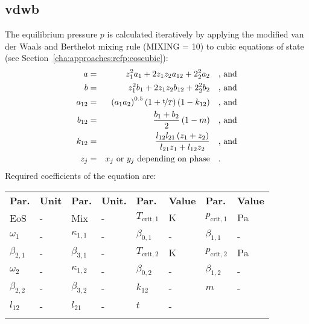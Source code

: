 \subsection{vdwb}
\label{cha:approaches:abs:mic:vdwb}
%
The equilibrium pressure $p$ is calculated iteratively by applying the modified van der Waals and Berthelot mixing rule (MIXING = 10) to cubic equations of state (see Section~\ref{cha:approaches:refp:eoscubic}):
%
\begin{equation*}
	\begin{split}
		a &=& z_1^2 a_1 + 2 z_1 z_2 a_{12} + 2_2^2 a_2 & \quad\text{, and} \\
		b &=& z_1^2 b_1 + 2 z_1 z_2 b_{12} + 2_2^2 b_2 & \quad\text{, and} \\
		a_{12} &=& \left( a_1 a_2 \right) ^{0.5} \left( 1 + \nicefrac{t}{T} \right) \left(1 - k_{12} \right) & \quad\text{, and} \\
		b_{12} &=& \frac{ b_1 + b_2 }{2} \left(1 - m \right) & \quad\text{, and} \\
		k_{12} &=& \frac{l_{12} l_{21} \left(z_1 + z_2 \right)}{l_{21} z_1 + l_{12} z_2} & \quad\text{, and} \\
		z_j &=& x_j \textrm { or } y_j \textrm{ depending on phase} & \quad\text{.} \\
	\end{split}
\end{equation*}
%
Required coefficients of the equation are:
%
\begin{longtable}[l]{ll|ll|ll|ll}
	\toprule
	\addlinespace
	\textbf{Par.} & \textbf{Unit} & \textbf{Par.} &	\textbf{Unit.} & \textbf{Par.} & \textbf{Value} & \textbf{Par.} & \textbf{Value} \\
	\addlinespace
	\midrule
	\endhead
	
	\bottomrule
	\endfoot
	\bottomrule
	\endlastfoot
	\addlinespace
	
	EoS & - & Mix & - &$T_\mathrm{crit,1}$ & $\si{\kelvin}$ &$p_\mathrm{crit,1}$ & $\si{\pascal}$ \\
	$\omega_{1}$ & - &$\kappa_{1,1}$ & - &$\beta_{0,1}$ & - &$\beta_{1,1}$ & - \\
	$\beta_{2,1}$ & - &$\beta_{3,1}$ & - &$T_\mathrm{crit,2}$ & $\si{\kelvin}$ &$p_\mathrm{crit,2}$ & $\si{\pascal}$ \\
	$\omega_{2}$ & - &$\kappa_{1,2}$ & - &$\beta_{0,2}$ & - &$\beta_{1,2}$ & - \\
	$\beta_{2,2}$ & - &$\beta_{3,2}$ & - &$k_{12}$ & - &$m$ & - \\
	$l_{12}$ & - & $l_{21}$ & - & $t$ & - & &  \\
	
	\addlinespace
\end{longtable}
